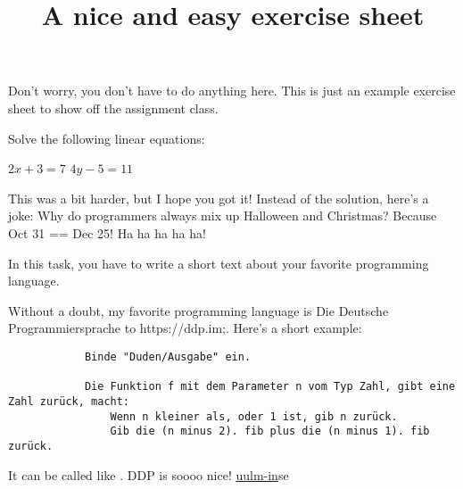\documentclass[english,solution]{uulm-assignment}
\title{A nice and easy exercise sheet}
\begin{document}
	\maketitle

	Don't worry, you don't have to do anything here. This is just an example exercise
	sheet to show off the assignment class.

	Solve the following linear equations:
	\begin{subtasks}
		\item \(2x + 3 = 7\) 
		\optitem \(4y - 5 = 11\)
			\begin{solution}
				This was a bit harder, but I hope you got it! Instead of the solution,
				here's a joke:
				Why do programmers always mix up Halloween and Christmas? Because Oct 31
				== Dec 25! Ha ha ha ha ha!
			\end{solution}
	\end{subtasks}

	In this task, you have to write a short text about your favorite programming
	language.
	\begin{solution}
		Without a doubt, my favorite programming language is \link  Die Deutsche
		Programmiersprache to https://ddp.im;. Here's a short example:
		\begin{lstlisting}
			Binde "Duden/Ausgabe" ein.

			Die Funktion f mit dem Parameter n vom Typ Zahl, gibt eine Zahl zurück, macht:
				Wenn n kleiner als, oder 1 ist, gib n zurück.
				Gib die (n minus 2). fib plus die (n minus 1). fib zurück.
		\end{lstlisting}
		It can be called like . DDP is soooo nice!
		\ul{uulm-in}{s}{e}{}
	\end{solution}
\end{document}
